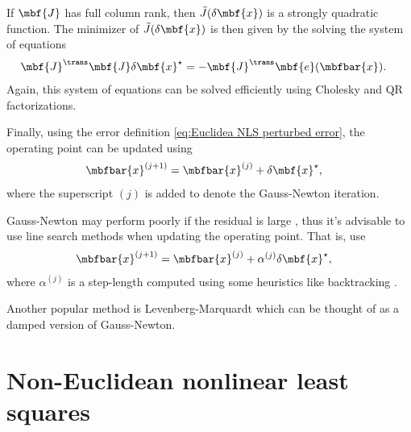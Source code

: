 \documentclass[nobib]{tufte-handout}
\begin{document}
    If $\mbf{J}$ has full column rank, then $\tilde{J}(\delta\mbf{x})$ is a strongly quadratic function. The minimizer of $\tilde{J}(\delta\mbf{x})$ is then given by the solving the system of equations
    \begin{align}
        \mbf{J}^{\trans}\mbf{J}\delta\mbf{x}^{\star} &= -\mbf{J}^{\trans}\mbf{e}(\mbfbar{x}).
    \end{align}
    Again, this system of equations can be solved efficiently using Cholesky and QR factorizations.

    Finally, using the error definition \eqref{eq:Euclidea NLS perturbed error}, the operating point can be updated using
    \begin{align}
        \mbfbar{x}^{(j+1)} &= \mbfbar{x}^{(j)} + \delta\mbf{x}^{\star},
    \end{align}
    where the superscript $(j)$ is added to denote the Gauss-Newton iteration.

    Gauss-Newton may perform poorly if the residual is large \cite{Nocedal_Numerical_2006,Fletcher_Practical_1987}, thus it's advisable to use line search methods when updating the operating point. That is, use
    \begin{align}
        \mbfbar{x}^{(j+1)} &= \mbfbar{x}^{(j)} + \alpha^{(j)}\delta\mbf{x}^{\star},
    \end{align}
    where $\alpha^{(j)}$ is a step-length computed using some heuristics like backtracking \cite{Nocedal_Numerical_2006}.

    Another popular method is Levenberg-Marquardt \cite{Dellaert_Factor_2017,Nocedal_Numerical_2006} which can be thought of as a damped version of Gauss-Newton.

    
    \section{Non-Euclidean nonlinear least squares}
    

    \clearpage
    
    
\end{document}
